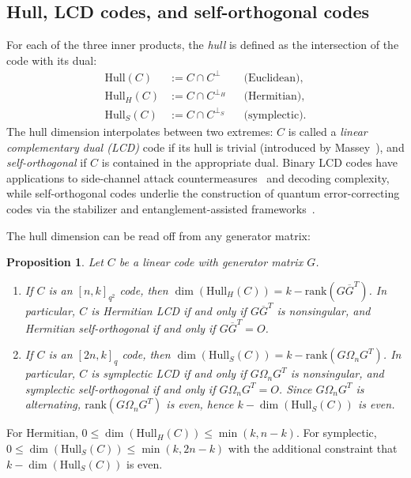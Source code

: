 \documentclass[10pt,a4paper]{amsart}
\newtheorem{proposition}[theorem]{Proposition}
\newcommand{\HHull}{\mathrm{Hull}_H}
\begin{document}
\subsection{Hull, LCD codes, and self-orthogonal codes}\label{sec:prelim-hull}

For each of the three inner products, the \emph{hull} is defined as the intersection of the code
with its dual:
\begin{align*}
  \mathrm{Hull}(C) &:= C \cap C^\perp & &\text{(Euclidean),}\\
  \HHull(C) &:= C \cap C^{\perp_H} & &\text{(Hermitian),}\\
  \mathrm{Hull}_S(C) &:= C \cap C^{\perp_S} & &\text{(symplectic).}
\end{align*}
The hull dimension interpolates between two extremes: $C$ is called a
\emph{linear complementary dual (LCD)} code if its hull is trivial
(introduced by Massey~\cite{Massey1992}), and \emph{self-orthogonal} if $C$
is contained in the appropriate dual.
Binary LCD codes have applications to side-channel attack countermeasures~\cite{CarletGuilley2016}
and decoding complexity, while self-orthogonal codes underlie the construction of
quantum error-correcting codes via the stabilizer and entanglement-assisted frameworks~\cite{KKKS2006,Dcc-EAqecc}.

The hull dimension can be read off from any generator matrix:
\begin{proposition}\label{prop:hull-dim}
Let $C$ be a linear code with generator matrix $G$.
\begin{enumerate}
\item \cite[Proposition 3.2]{Dcc-EAqecc} If $C$ is an $[n, k]_{q^2}$ code, then
$\dim(\HHull(C)) = k - \mathrm{rank}(G \overline{G}^T)$.
In particular, $C$ is Hermitian LCD if and only if $G \overline{G}^T$ is nonsingular,
and Hermitian self-orthogonal if and only if $G \overline{G}^T = O$.
\item If $C$ is an $[2n, k]_q$ code, then
$\dim(\mathrm{Hull}_S(C)) = k - \mathrm{rank}(G \Omega_n G^T)$.
In particular, $C$ is symplectic LCD if and only if $G \Omega_n G^T$ is nonsingular,
and symplectic self-orthogonal if and only if $G \Omega_n G^T = O$. Since $G \Omega_n G^T$
is alternating, $\mathrm{rank}(G \Omega_n G^T)$ is even, hence
$k - \dim(\mathrm{Hull}_S(C))$ is even.
\end{enumerate}
\end{proposition}
For Hermitian, $0 \leq \dim(\HHull(C)) \leq \min(k, n-k)$.
For symplectic, $0 \leq \dim(\mathrm{Hull}_S(C)) \leq \min(k, 2n-k)$ with the
additional constraint that $k - \dim(\mathrm{Hull}_S(C))$ is even.
\end{document}
